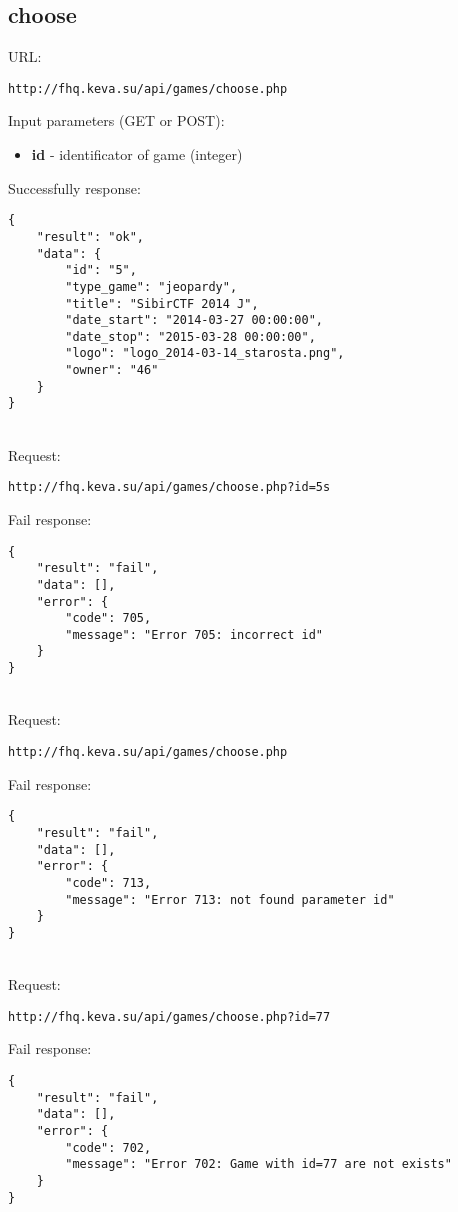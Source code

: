 \subsection{choose}
\par

URL:
\begin{Verbatim}[frame=single]
http://fhq.keva.su/api/games/choose.php
\end{Verbatim}

Input parameters (GET or POST):
\begin{itemize}
  \item \textbf{id} - identificator of game (integer)
\end{itemize}

Successfully response:  \\
\begin{Verbatim}[frame=single]
{
    "result": "ok",
    "data": {
        "id": "5",
        "type_game": "jeopardy",
        "title": "SibirCTF 2014 J",
        "date_start": "2014-03-27 00:00:00",
        "date_stop": "2015-03-28 00:00:00",
        "logo": "logo_2014-03-14_starosta.png",
        "owner": "46"
    }
}
\end{Verbatim}

\\
Request:
\begin{Verbatim}[frame=single]
http://fhq.keva.su/api/games/choose.php?id=5s
\end{Verbatim}
Fail response:
\begin{Verbatim}[frame=single]
{
    "result": "fail",
    "data": [],
    "error": {
        "code": 705,
        "message": "Error 705: incorrect id"
    }
}
\end{Verbatim}
\\
Request:
\begin{Verbatim}[frame=single]
http://fhq.keva.su/api/games/choose.php
\end{Verbatim}
Fail response:
\begin{Verbatim}[frame=single]
{
    "result": "fail",
    "data": [],
    "error": {
        "code": 713,
        "message": "Error 713: not found parameter id"
    }
}
\end{Verbatim}

\\
Request:
\begin{Verbatim}[frame=single]
http://fhq.keva.su/api/games/choose.php?id=77
\end{Verbatim}
Fail response:
\begin{Verbatim}[frame=single]
{
    "result": "fail",
    "data": [],
    "error": {
        "code": 702,
        "message": "Error 702: Game with id=77 are not exists"
    }
}
\end{Verbatim}


